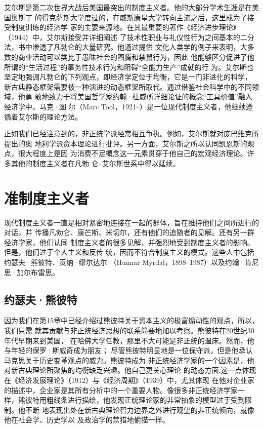 艾尔斯是第二次世界大战后美国最突出的制度主义者。他的大部分学术生涯是在美国奥斯丁
的得克萨斯大学度过的，在威斯康星大学转向主流之后，这里成为了接受制度训练的经济学
家的主要来源地。在其最重要的著作《经济进步理论》（1944）中，艾尔斯接受并详细阐述
了技术性职业与礼仪性行为之间基本的二分法，书中渗透了凡勃仑的大量研究。他通过提供
文化人类学的例子来表明，大多数的商业活动可以类比于愚昧社会的图腾和禁鼠行为，因此
他能够区分促进了他所谓的“生活过程”的事务性技术行为和阻碍“全能力生产”成就的行
为。艾尔斯也坚定地强调凡勃仑的下列观点，即经济学定位于均衡，它是一门非进化的科学，
新古典静态框架需要被一种演进的动态框架所取代。通过借鉴社会科学中的不同领域，他勇
敢地致力于将美国哲学家约翰·杜威所详细论证的概念“工具价值”融入经济学中。马克·图
尔（Marc Tool，1921--）是一位现代制度主义者，他继续遵循着艾尔斯的理论方法。

正如我们已经注意到的，非正统学派经常相互争执。例如，艾尔斯就对庞巴维克所提出的奥
地利学派资本理论进行批评。另一方面，艾尔斯之所以认同凯恩斯的观点，很大程度上是因
为消费不足概念这一元素贯穿于他自己的宏观经济理论。许多其他的制度主义者在凡勃
仑--艾尔斯世系中得以延续。

\section{准制度主义者}

现代制度主义者一直是相对紧密地连接在一起的群体，旨在维持他们之间所进行的对话，并
传播凡勃仑、康芒斯、米切尔，还有他们的追随者的见解。还有另一群经济学家，他们认同
制度主义者的很多见解，并强烈地受到制度主义者的影响。但是，他们过于个人主义和反传
统，因而不符合制度主义的模式。这些人中包括约瑟夫·熊彼特、贡纳·缪尔达尔
（Hunnar Myrdal，1898--1987）以及约翰·肯尼思·加尔布雷思。

\subsection{约瑟夫·熊彼特}

因为我们在第15章中已经介绍过熊彼特关于资本主义的极富煽动性的观点，所以，我们只需
就其贡献与非正统经济思想的联系简要地加以考察。熊彼特在20世纪30年代早期来到美国，
在哈佛大学任教，那里不大可能是非正统的温床。然而，他与年轻的保罗·斯威奇成为朋友；
尽管熊彼特明显地是一位保守派，但是他承认马克思关于历史变革观点的威力。熊彼特成为
非正统经济学家的一个因素是，他对新古典理论所聚焦的均衡缺乏兴趣。他自己更关心理论
的动态方面,这一点体现在《经济发展理论》（1912）与《经济周期》（1939）中，尤其体现
在他对企业家的描述中，企业家是其所有分析中的一个重要人物。像很多非正统经济学家一
样，熊彼特用粗线条进行描绘，他发现正统理论家的非常抽象的模型过于受到限制。他不断
地表现出处在新古典理论智力边界之外进行观望的非正统倾向，就像他在社会学、历史学以
及政治学的禁猎地偷猫一样。

